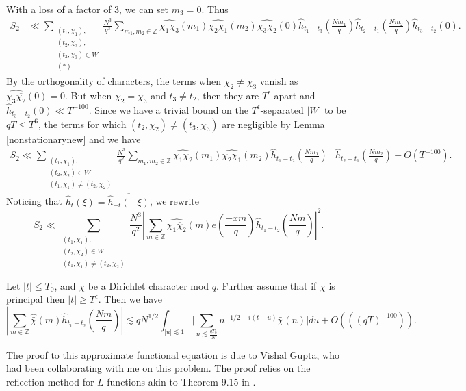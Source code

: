 With a loss of a factor of $3$, we can set $m_3=0$. Thus \begin{align*}
    S_2&\ll\sum_{\substack{(t_1,\chi_1),\\(t_2,\chi_2),\\(t_3,\chi_3)\in W \\ (*)}}
    \frac{N^3}{q^3}\sum_{m_1,m_2\in\mathbb{Z}}\widehat{{\chi_1{\overline{\chi}_3}}}(m_1)\widehat{\chi_2\overline{\chi}_1}(m_2)\widehat{\chi_3\overline{\chi}_2}(0) \hat{h}_{t_1-t_3}\left(\frac{Nm_1}{q}\right)\hat{h}_{t_2-t_1}\left(\frac{Nm_2}{q}\right)\hat{h}_{t_3-t_2}\left(0\right).
\end{align*}
By the orthogonality of characters, the terms when $\chi_2\neq \chi_3$ vanish as $\widehat{\chi_3\overline{\chi_2}}(0)=0.$ But when $\chi_2=\chi_3$ and $t_3\neq t_2$, then they are $T^{\epsilon}$ apart and $\hat{h}_{t_3-t_2}(0)\ll T^{-100}$. Since we have a trivial bound on the $T^{\epsilon}$-separated $|W|$ to be $qT\leq T^6$, 
 the terms for which $(t_2,\chi_2)\neq(t_3,\chi_3)$ are negligible by Lemma \ref{nonstationarynew} and we have \begin{align*}
	 S_2\ll\sum_{\substack{(t_1,\chi_1),\\(t_2,\chi_2)\in W \\ (t_1,\chi_1)\neq (t_2,\chi_2)}}
	\frac{N^3}{q^2}\sum_{m_1,m_2\in\mathbb{Z}}\widehat{{\chi_1{\overline{\chi}_2}}}(m_1)\widehat{\chi_2\overline{\chi}_1}(m_2)
	\hat{h}_{t_1-t_2}\left(\frac{Nm_1}{q}\right)&\hat{h}_{t_2-t_1}\left(\frac{Nm_2}{q}\right)+O(T^{-100}).
\end{align*}   
Noticing that $\hat{h}_t(\xi)=\overline{\hat{h}_{-t}(-\xi)}$, we rewrite \begin{equation} \label{S2clean}
    S_2 \ll\sum_{\substack{(t_1,\chi_1),\\(t_2,\chi_2)\in W \\ (t_1,\chi_1)\neq (t_2,\chi_2)}}
    \frac{N^3}{q^2}\left|\sum_{m \in \mathbb{Z}}\widehat{{\chi_1{\overline{\chi}_2}}}(m) e\left(\frac{-xm}{q}\right)
    \hat{h}_{t_1-t_2}\left(\frac{Nm}{q}\right)\right|^2.
\end{equation}
\begin{lemma}
    Let $|t|\leq T_0$, and $\chi$ be a Dirichlet character mod $q$. Further assume that if $\chi$ is principal then $|t|\geq T^{\epsilon}$. Then we have \[
        \left|\sum_{m \in \mathbb{Z}}\hat{\bar{\chi}}(m)
        \hat{h}_{t_1-t_2}\left(\frac{Nm}{q}\right)\right|\lesssim qN^{1/2}\int_{|u|\lesssim 1}\Big|\sum_{n\lesssim \frac{qT_0}{N}}n^{-1/2-i(t+u)}\bar{\chi}(n)\Big| du + O(((qT)^{-100})).
    \]
\end{lemma}
The proof to this approximate functional equation is due to Vishal Gupta, who had been collaborating with me on this problem. The proof relies on the reflection method for $L$-functions akin to Theorem 9.15 in \cite{iwaniec}. 

